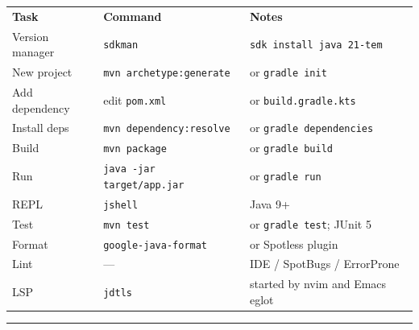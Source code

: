 \documentclass[10pt]{extarticle}
\begin{document}
\small


\begin{tabularx}{\linewidth}{@{}l@{\quad}l@{\quad}Y@{}}
\textbf{Task}        & \textbf{Command}                                  & \textbf{Notes} \\[2pt]
Version manager      & \texttt{sdkman}                                    & \texttt{sdk install java 21-tem} \\
New project          & \texttt{mvn archetype:generate}                    & or \texttt{gradle init} \\
Add dependency       & edit \texttt{pom.xml}                              & or \texttt{build.gradle.kts} \\
Install deps         & \texttt{mvn dependency:resolve}                    & or \texttt{gradle dependencies} \\
Build                & \texttt{mvn package}                               & or \texttt{gradle build} \\
Run                  & \texttt{java -jar target/app.jar}                  & or \texttt{gradle run} \\
REPL                 & \texttt{jshell}                                    & Java 9+ \\
Test                 & \texttt{mvn test}                                  & or \texttt{gradle test}; JUnit 5 \\
Format               & \texttt{google-java-format}                        & or Spotless plugin \\
Lint                 & ---                                                & IDE / SpotBugs / ErrorProne \\
LSP                  & \texttt{jdtls}                                     & started by nvim and Emacs eglot \\
\end{tabularx}

\vspace{6pt}
\rule{\linewidth}{0.2pt}
\end{document}
